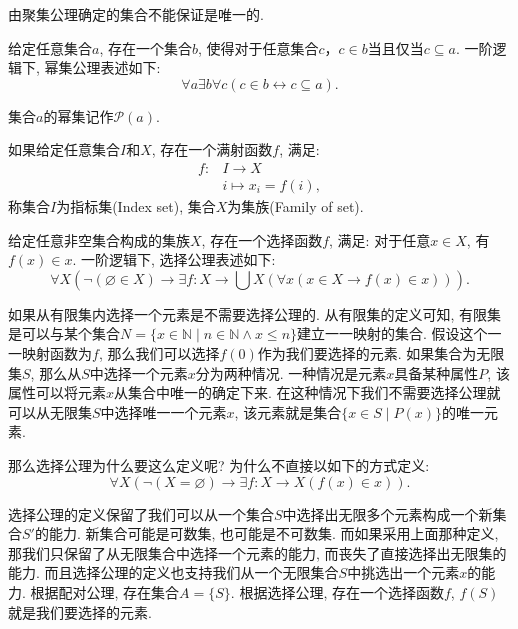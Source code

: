 由聚集公理确定的集合不能保证是唯一的.

\begin{axiom}[幂集公理]
	给定任意集合$a$, 存在一个集合$b$, 使得对于任意集合$c$，$c\in b$当且仅当$c\subseteq a$. 一阶逻辑下, 幂集公理表述如下:
	\begin{equation}
		\forall a\exists b\forall c(c\in b\leftrightarrow c\subseteq a).
	\end{equation}
\end{axiom}

集合$a$的幂集记作$\mathscr P(a)$.

\begin{definition}[集族]
	如果给定任意集合$I$和$X$, 存在一个满射函数$f$, 满足:
	\begin{align*}
	f\colon & I\rightarrow X \\
	& i\mapsto x_i=f(i),
	\end{align*}
	称集合$I$为指标集(Index set), 集合$X$为集族(Family of set).
\end{definition}

\begin{axiom}[选择公理]
	给定任意非空集合构成的集族$X$, 存在一个选择函数$f$, 满足: 对于任意$x\in X$, 有$f(x)\in x$. 一阶逻辑下, 选择公理表述如下:
	\begin{equation}
		\forall X(\neg(\varnothing\in X)\rightarrow \exists f\colon X\rightarrow \bigcup X(\forall x(x\in X\rightarrow f(x)\in x))).
	\end{equation}
\end{axiom}

如果从有限集内选择一个元素是不需要选择公理的. 从有限集的定义可知, 有限集是可以与某个集合$N=\{x\in \mathbb{N}\mid n\in \mathbb{N}\wedge x\leqslant n\}$建立一一映射的集合. 假设这个一一映射函数为$f$, 那么我们可以选择$f(0)$作为我们要选择的元素. 如果集合为无限集$S$, 那么从$S$中选择一个元素$x$分为两种情况. 一种情况是元素$x$具备某种属性$P$, 该属性可以将元素$x$从集合中唯一的确定下来. 在这种情况下我们不需要选择公理就可以从无限集$S$中选择唯一一个元素$x$, 该元素就是集合$\{x\in S\mid P(x)\}$的唯一元素.

那么选择公理为什么要这么定义呢? 为什么不直接以如下的方式定义:
\[
\forall X(\neg(X=\varnothing)\rightarrow \exists f\colon X\rightarrow X(f(x)\in x)).
\]

选择公理的定义保留了我们可以从一个集合$S$中选择出无限多个元素构成一个新集合$S'$的能力. 新集合可能是可数集, 也可能是不可数集. 而如果采用上面那种定义, 那我们只保留了从无限集合中选择一个元素的能力, 而丧失了直接选择出无限集的能力. 而且选择公理的定义也支持我们从一个无限集合$S$中挑选出一个元素$x$的能力. 根据配对公理, 存在集合$A=\{S\}$. 根据选择公理, 存在一个选择函数$f$, $f(S)$就是我们要选择的元素.

